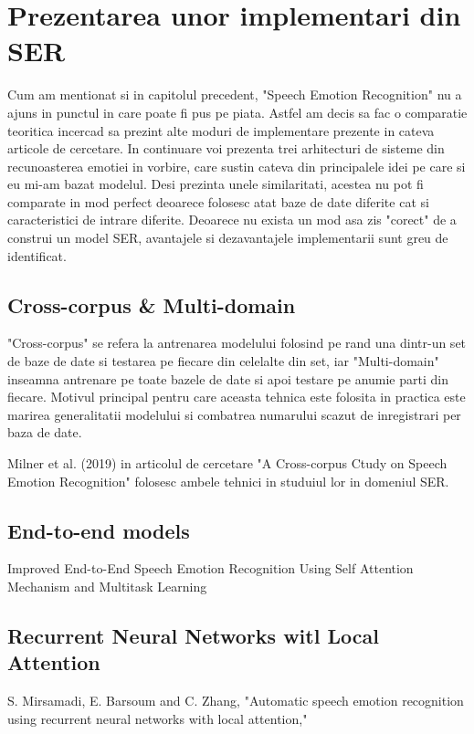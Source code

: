 \documentclass[a4paper,12pt, twoside]{book}
\begin{document}
				
				\section{Prezentarea unor implementari din SER}
					Cum am mentionat si in capitolul precedent, "Speech Emotion Recognition" nu a ajuns in punctul in care poate fi pus pe piata. Astfel am decis sa fac o comparatie teoritica incercad sa prezint alte moduri de implementare prezente in cateva articole de cercetare. In continuare voi prezenta trei arhitecturi de sisteme din recunoasterea emotiei in vorbire, care sustin cateva din principalele idei pe care si eu mi-am bazat modelul. Desi prezinta unele similaritati, acestea nu pot fi comparate in mod perfect deoarece folosesc atat baze de date diferite cat si caracteristici de intrare diferite. Deoarece nu exista un mod asa zis "corect" de a construi un model SER, avantajele si dezavantajele implementarii sunt greu de identificat. \par		
					
					\subsection{Cross-corpus \& Multi-domain}
						"Cross-corpus" se refera la antrenarea modelului folosind pe rand una dintr-un set de baze de date si testarea pe fiecare din celelalte din set, iar "Multi-domain" inseamna antrenare pe toate bazele de date si apoi testare pe anumie parti din fiecare. Motivul principal pentru care aceasta tehnica este folosita in practica este marirea generalitatii modelului si combatrea numarului scazut de inregistrari per baza de date. \par
						
						Milner et al. (2019) in articolul de cercetare "A Cross-corpus Ctudy on Speech Emotion Recognition" folosesc ambele tehnici in studuiul lor in domeniul SER. 
						
					\subsection{End-to-end models}
						Improved End-to-End Speech Emotion Recognition Using Self Attention	Mechanism and Multitask Learning
					\subsection{Recurrent Neural Networks witl Local Attention}
						S. Mirsamadi, E. Barsoum and C. Zhang, "Automatic speech emotion recognition using recurrent neural networks with local attention,"
				
\end{document}
